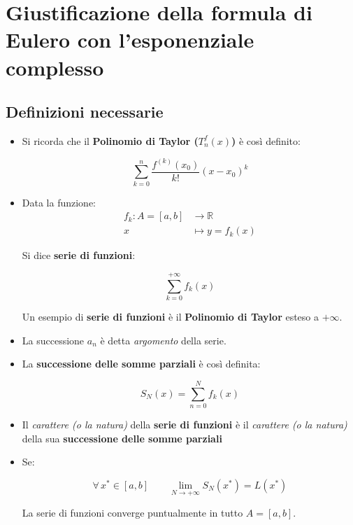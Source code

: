 \documentclass[../dimostrazioni]{subfiles}
\begin{document}
    \chapter{Giustificazione della formula di Eulero con l’esponenziale complesso}
    \label{formulaEulero}

        \section*{Definizioni necessarie}

            \begin{itemize}
                \item Si ricorda che il \textbf{Polinomio di Taylor (\(T _n ^ f (x) \))} è così definito:

                        \[ \sum_{k = 0}^{n} \frac{f^{(k)} (x_0)}{k!}(x-x_0)^k\]
                    
                \item Data la funzione:
                        \begin{align*}
                            f_k : A = [a, b] &\longrightarrow \mathbb{R}\\
                                         x &\longmapsto y = f_k(x) 
                        \end{align*}
    
                        Si dice \textbf{serie di funzioni}:

                        \[  \sum_{k=0}^{+\infty} f_k(x) \]

                        Un esempio di \textbf{serie di funzioni} è il \textbf{Polinomio di Taylor} esteso a \(+\infty\).

                \item La successione \(a_n\) è detta \textit{argomento} della serie.
                \item La \textbf{successione delle somme parziali} è così definita:
                      
                        \[  S_N (x) = \sum_{n=0}^{N} f_k(x) \]
                    
                \item Il  \textit{carattere (o la natura)} della \textbf{serie di funzioni} è il \textit{carattere (o la natura)} della sua \textbf{successione delle somme parziali}
                \item Se:
                
                        \[  \forall \, x^* \in [a, b] \qquad \lim_{N \to +\infty} S_N (x^*) = L(x^*)    \]

                        La serie di funzioni converge puntualmente in tutto \(A = [a, b]\).
            \end{itemize}
           
\end{document}

